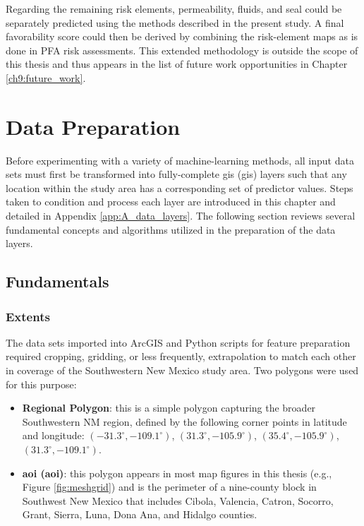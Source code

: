 Regarding the remaining risk elements, permeability, fluids, and seal could be separately predicted using the methods described in the present study. A final favorability score could then be derived by combining the risk-element maps as is done in PFA risk assessments. This extended methodology is outside the scope of this thesis and thus appears in the list of future work opportunities in Chapter \ref{ch9:future_work}.

\section{Data Preparation}\label{ch3:data_prep}
Before experimenting with a variety of machine-learning methods, all input data sets must first be transformed into fully-complete \acrlong{gis} (\acrshort{gis}) layers such that any location within the study area has a corresponding set of predictor values. Steps taken to condition and process each layer are introduced in this chapter and detailed in Appendix \ref{app:A_data_layers}. The following section reviews several fundamental concepts and algorithms utilized in the preparation of the data layers.

\subsection{Fundamentals}\label{ch3:data_prep_fundamentals}
\subsubsection{Extents}\label{ch3:extents}
The data sets imported into ArcGIS and Python scripts for feature preparation required cropping, gridding, or less frequently, extrapolation to match each other in coverage of the Southwestern New Mexico study area. Two polygons were used for this purpose:

\begin{itemize}
\item \textbf{Regional Polygon}: this is a simple polygon capturing the broader Southwestern NM region, defined by the following corner points in latitude and longitude: $(-31.3^\circ, -109.1^\circ)$, $(31.3^\circ, -105.9^\circ)$, $(35.4^\circ, -105.9^\circ)$, $(31.3^\circ, -109.1^\circ)$.

\item \textbf{\acrlong{aoi} (\acrshort{aoi})}: this polygon appears in most map figures in this thesis (e.g., Figure \ref{fig:meshgrid}) and is the perimeter of a nine-county block in Southwest New Mexico that includes Cibola, Valencia, Catron, Socorro, Grant, Sierra, Luna, Dona Ana, and Hidalgo counties.
\end{itemize}

